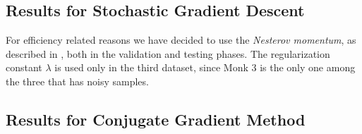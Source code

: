         \subsection{Results for Stochastic Gradient Descent} %
        \label{sub:results_for_stochastic_gradient_descent}

            \begin{table}[H]
                \centering
                \begin{subtable}{\textwidth}
                \end{subtable}
                \caption{Results for the Stochastic Gradient Descent.}
                \label{tab:monks_sgd}
            \end{table}

            For efficiency related reasons we have decided to use the \textit{Nesterov momentum}, as
            described in \cite{Goodfellow-et-al-2016,Sutskever:2013:IIM:3042817.3043064}, both in the
            validation and testing phases. The regularization constant $\lambda$ is used only in the third
            dataset, since Monk 3 is the only one among the three that has noisy samples.


        \subsection{Results for Conjugate Gradient Method} %
        \label{sub:results_for_conjugate_gradient_method}

